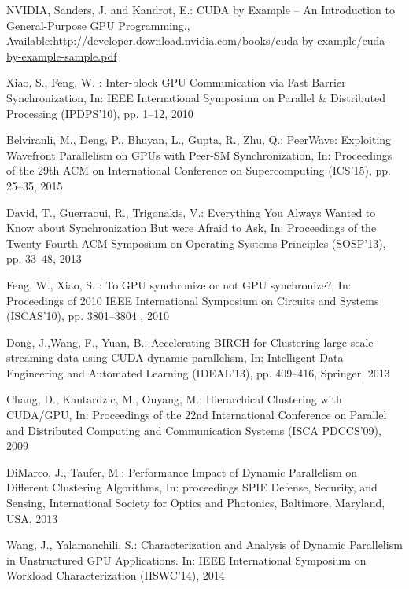 \documentclass[conference]{IEEEtran}
\begin{document}
\begin{thebibliography}{4}
	
	 	NVIDIA, Sanders, J. and Kandrot, E.: CUDA by Example -- An Introduction to General-Purpose GPU Programming., \\Available:\url{http://developer.download.nvidia.com/books/cuda-by-example/cuda-by-example-sample.pdf}
	
	 Xiao, S., Feng, W. : Inter-block GPU Communication via Fast Barrier Synchronization,
	In: IEEE International Symposium on Parallel \& Distributed Processing (IPDPS'10), pp. 1--12, 2010
	
	 Belviranli, M., Deng, P., Bhuyan, L., Gupta, R., Zhu, Q.: PeerWave: Exploiting Wavefront Parallelism on GPUs with Peer-SM Synchronization, In: Proceedings of the 29th ACM on International Conference on Supercomputing (ICS'15),
	pp. 25--35, 2015
	
	 David, T., Guerraoui, R., Trigonakis, V.: Everything You Always Wanted to Know about Synchronization But were Afraid to Ask,
	In: Proceedings of the Twenty-Fourth ACM Symposium on Operating Systems Principles (SOSP'13), pp. 33--48, 2013
	
	 Feng, W., Xiao, S. : To GPU synchronize or not GPU synchronize?,
	In: Proceedings of 2010 IEEE International Symposium on Circuits and Systems (ISCAS'10), pp. 3801--3804 , 2010
	
	 Dong, J.,Wang, F., Yuan, B.: Accelerating BIRCH for Clustering 
	large scale streaming data using CUDA dynamic parallelism, In: Intelligent
	Data Engineering and Automated Learning (IDEAL’13), pp. 409--416,
	Springer, 2013
	
	 Chang, D., Kantardzic,  M., Ouyang, M.: Hierarchical Clustering with
	CUDA/GPU, In: Proceedings of the 22nd International Conference on
	Parallel and Distributed Computing and Communication Systems (ISCA
	PDCCS’09), 2009
	
	 DiMarco, J., Taufer, M.: Performance Impact of Dynamic Parallelism
	on Different Clustering Algorithms, In: proceedings SPIE Defense,
	Security, and Sensing, International Society for Optics and Photonics,
	Baltimore, Maryland, USA, 2013
	
	 Wang, J., Yalamanchili, S.: Characterization and Analysis of
	Dynamic Parallelism in Unstructured GPU Applications. In: IEEE International
	Symposium on Workload Characterization (IISWC'14), 2014
	

\end{thebibliography}
\end{document}
